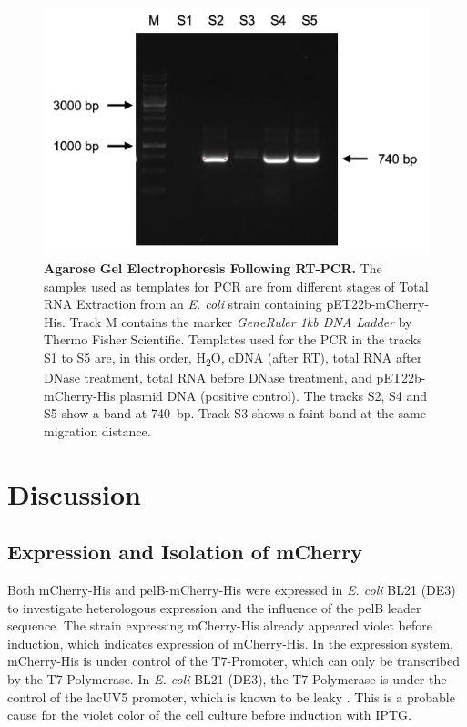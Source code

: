 \documentclass[a4paper,12pt]{article}
\begin{document}
\begin{figure}[h!]
    \centering
    \includegraphics[width=\textwidth]{images/rna_post_pcr.png}
    \caption{\textbf{Agarose Gel Electrophoresis Following RT-PCR.} The samples used as templates for PCR are from different stages of Total RNA Extraction from an \emph{E. coli} strain containing pET22b-mCherry-His. Track M contains the marker \emph{GeneRuler 1kb DNA Ladder} by Thermo Fisher Scientific. Templates used for the PCR in the tracks S1 to S5 are, in this order, H\textsubscript{2}O, cDNA (after RT), total RNA after DNase treatment, total RNA before DNase treatment, and pET22b-mCherry-His plasmid DNA (positive control). The tracks S2, S4 and S5 show a band at 740~bp. Track S3 shows a faint band at the same migration distance.}
    \label{fig:rna2}
\end{figure}
\FloatBarrier
\section{Discussion}
\subsection{Expression and Isolation of mCherry}
Both mCherry-His and pelB-mCherry-His were expressed in \emph{E. coli} BL21 (DE3) to investigate heterologous expression and the influence of the pelB leader sequence. The strain expressing mCherry-His already appeared violet before induction, which indicates expression of mCherry-His. In the expression system, mCherry-His is under control of the T7-Promoter, which can only be transcribed by the T7-Polymerase. In \emph{E. coli} BL21 (DE3), the T7-Polymerase is under the control of the lacUV5 promoter, which is known to be leaky \cite{du2021regulating}. This is a probable cause for the violet color of the cell culture before induction with IPTG. 
\end{document}
